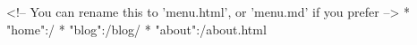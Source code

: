 <!-- You can rename this to 'menu.html', or 'menu.md' if you prefer -->
* "home":/
* "blog":/blog/
* "about":/about.html
